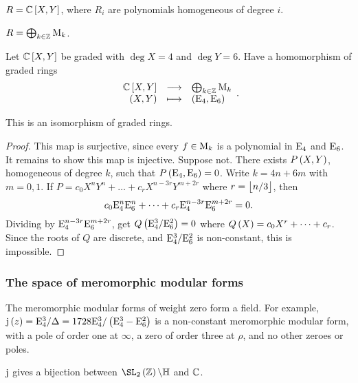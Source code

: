 \begin{example*}
$ R = \CC\sbr{X, Y} $, where $ R_i $ are polynomials homogeneous of degree $ i $.
\end{example*}

\begin{example*}
$ R = \bigoplus_{k \in \mathbb{Z}} \mathrm{M}_k $.
\end{example*}

\pagebreak

Let $ \CC\sbr{X, Y} $ be graded with $ \deg X = 4 $ and $ \deg Y = 6 $. Have a homomorphism of graded rings
$$ \function{\CC\sbr{X, Y}}{\bigoplus_{k \in \ZZ} \M_k}{\br{X, Y}}{\br{\E_4, \E_6}}. $$

\begin{theorem}
This is an isomorphism of graded rings.
\end{theorem}

\begin{proof}
This map is surjective, since every $ f \in \mathrm{M}_k $ is a polynomial in $ \mathrm{E}_4 $ and $ \mathrm{E}_6 $. It remains to show this map is injective. Suppose not. There exists $ P\br{X, Y} $, homogeneous of degree $ k $, such that $ P\br{\E_4, \E_6} = 0 $. Write $ k = 4n + 6m $ with $ m = 0, 1 $. If $ P = c_0X^nY^n + \dots + c_rX^{n - 3r}Y^{m + 2r} $ where $ r = \left\lfloor n / 3 \right\rfloor $, then
$$ c_0\mathrm{E}_4^n\mathrm{E}_6^n + \dots + c_r\mathrm{E}_4^{n - 3r}\mathrm{E}_6^{m + 2r} = 0. $$
Dividing by $ \mathrm{E}_4^{n - 3r}\mathrm{E}_6^{m + 2r} $, get $ Q\br{\E_4^3 / \E_6^2} = 0 $ where $ Q\br{X} = c_0X^r + \dots + c_r $. Since the roots of $ Q $ are discrete, and $ \mathrm{E}_4^3 / \mathrm{E}_6^2 $ is non-constant, this is impossible.
\end{proof}

\subsubsection{The space of meromorphic modular forms}

\begin{note*}
The meromorphic modular forms of weight zero form a field. For example, $ \j\br{z} = \E_4^3 / \Delta = 1728\E_4^3 / \br{\E_4^3 - \E_6^2} $ is a non-constant meromorphic modular form, with a pole of order one at $ \infty $, a zero of order three at $ \rho $, and no other zeroes or poles.
\end{note*}

\begin{theorem}
$ \mathrm{j} $ gives a bijection between $ \SL_2\br{\ZZ} \backslash \HH $ and $ \mathbb{C} $.
\end{theorem}

